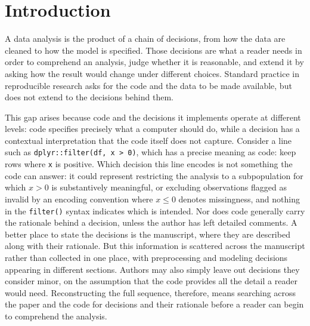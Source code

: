 \documentclass[aoas]{imsart}
\begin{document}
\section{Introduction}\label{sec-intro}

A data analysis is the product of a chain of decisions, from how the
data are cleaned to how the model is specified. Those decisions are what
a reader needs in order to comprehend an analysis, judge whether it is
reasonable, and extend it by asking how the result would change under
different choices. Standard practice in reproducible research
\citep{peng_reproducible_2011, wrobel_partnering_2024} asks for the code
and the data to be made available, but does not extend to the decisions
behind them.

This gap arises because code and the decisions it implements operate at
different levels: code specifies precisely what a computer should do,
while a decision has a contextual interpretation that the code itself
does not capture. Consider a line such as
\texttt{dplyr::filter(df,\ x\ \textgreater{}\ 0)}, which has a precise
meaning as code: keep rows where \texttt{x} is positive. Which decision
this line encodes is not something the code can answer: it could
represent restricting the analysis to a subpopulation for which
\(x > 0\) is substantively meaningful, or excluding observations flagged
as invalid by an encoding convention where \(x \le 0\) denotes
missingness, and nothing in the \texttt{filter()} syntax indicates which
is intended. Nor does code generally carry the rationale behind a
decision, unless the author has left detailed comments. A better place
to state the decisions is the manuscript, where they are described along
with their rationale. But this information is scattered across the
manuscript rather than collected in one place, with preprocessing and
modeling decisions appearing in different sections. Authors may also
simply leave out decisions they consider minor, on the assumption that
the code provides all the detail a reader would need. Reconstructing the
full sequence, therefore, means searching across the paper and the code
for decisions and their rationale before a reader can begin to
comprehend the analysis.
\end{document}

